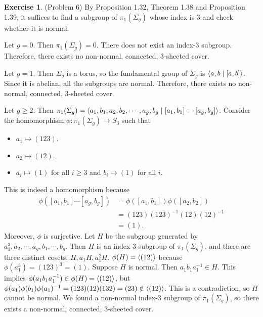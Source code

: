 \documentclass[12pt, psamsfonts]{amsart}
\theoremstyle{definition}
\newtheorem*{exer}{Exercise}
\theoremstyle{remark}
\numberwithin{equation}{section}
\begin{document}
\begin{exer}{(Problem 6)}
  By Proposition 1.32, Theorem 1.38 and Proposition 1.39, it suffices to find a subgroup of $\pi_1(\Sigma_g)$ whose index is 3 and check whether it is normal.

  Let $g = 0$.
  Then $\pi_1(\Sigma_g) = 0$.
  There does not exist an index-3 subgroup.
  Therefore, there exists no non-normal, connected, 3-sheeted cover.

  Let $g = 1$.
  Then $\Sigma_g$ is a torus, so the fundamental group of $\Sigma_g$ is $\ev{ a, b \mid [a, b] }$.
  Since it is abelian, all the subgroups are normal.
  Therefore, there exists no non-normal, connected, 3-sheeted cover.

  Let $g \geq 2$.
  Then $\pi_1(\Sigma_g) = \ev{a_1, b_1, a_2, b_2, \cdots, a_g, b_g \mid [a_1, b_1] \cdots [a_g, b_g]}$.
  Consider the homomorphism $\phi: \pi_1(\Sigma_g) \rightarrow S_3$ such that
  \begin{itemize}
    \item
      $a_1 \mapsto (123)$.
    \item
      $a_2 \mapsto (12)$.
    \item
      $a_i \mapsto (1)$ for all $i \geq 3$ and $b_i \mapsto (1)$ for all $i$.
  \end{itemize}
  This is indeed a homomorphism because 
  \begin{align*}
    \phi([a_1, b_1] \cdots [a_g, b_g])
        &= \phi([a_1, b_1])\phi([a_2, b_2]) \\
        &= (123)(123)^{-1}(12)(12)^{-1} \\
        &= (1).
  \end{align*}
  Moreover, $\phi$ is surjective.
  Let $H$ be the subgroup generated by $a_1^3, a_2, \cdots, a_g, b_1, \cdots, b_g$.
  Then $H$ is an index-3 subgroup of $\pi_1(\Sigma_g)$, and there are three distinct cosets, $H, a_1H, a_1^2H$.
  $\phi(H) = \ev{(12)}$ because $\phi(a_1^3) = (123)^3 = (1)$.
  Suppose $H$ is normal.
  Then $a_1b_1a_1^{-1} \in H$.
  This implies $\phi(a_1b_1a_1^{-1}) \in \phi(H) = \ev{(12)}$, but $\phi(a_1)\phi(b_1)\phi(a_1)^{-1} = (123)(12)(132) = (23) \notin \ev{(12)}$.
  This is a contradiction, so $H$ cannot be normal.
  We found a non-normal index-3 subgroup of $\pi_1(\Sigma_g)$, so there exists a non-normal, connected, 3-sheeted cover.
\end{exer}
\end{document}
